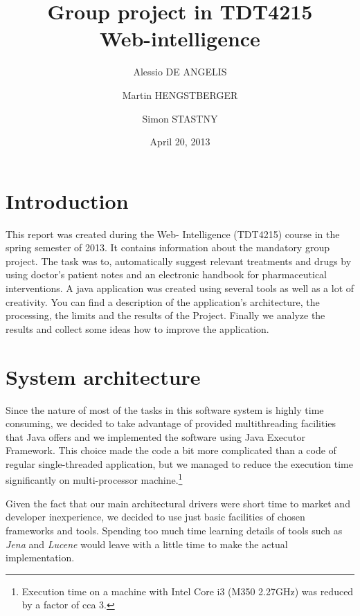 \documentclass{article}
\begin{document}
\title{Group project in TDT4215\\
Web-intelligence}

\date{April 20, 2013}

\author{
  Alessio DE ANGELIS\and 
  Martin HENGSTBERGER\and
  Simon STASTNY}

\maketitle

\tableofcontents
\newpage


\section{Introduction}

This report was created during the Web- Intelligence (TDT4215) course in the spring semester of 2013. It contains information about the mandatory group project. The task was to, automatically suggest relevant treatments and drugs by using doctor's patient notes and an electronic handbook for pharmaceutical interventions. A java application was created using several tools as well as a lot of creativity. You can find a description of the application's architecture, the processing, the limits and the results of the Project. Finally we analyze the results and collect some ideas how to improve the application.

\section{System architecture}

Since the nature of most of the tasks in this software system is highly time consuming, we decided to take advantage of provided multithreading facilities that Java offers and we implemented the software using Java Executor Framework. This choice made the code a bit more complicated than a code of regular single-threaded application, but we managed to reduce the execution time significantly on multi-processor machine.\footnote{Execution time on a machine with Intel Core i3 (M350 2.27GHz) was reduced by a factor of cca 3.}

Given the fact that our main architectural drivers were short time to market and developer inexperience, we decided to use just basic facilities of chosen frameworks and tools. Spending too much time learning details of tools such as \emph{Jena} and \emph{Lucene} would leave with a little time to make the actual implementation.
\end{document}

